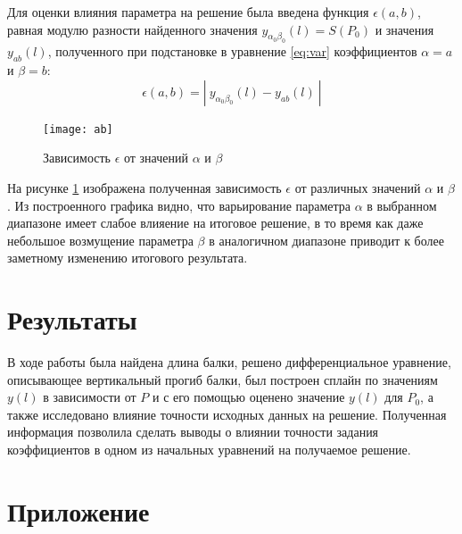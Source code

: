 Для оценки влияния параметра на решение была введена функция $\epsilon(a, b)$, равная модулю разности найденного значения $y_{\alpha_0\beta_0}(l) = S(P_0)$ и значения $y_{ab}(l)$, полученного при подстановке в уравнение \ref{eq:var} коэффициентов $\alpha = a$ и $\beta = b$:
\begin{equation}
	\epsilon(a, b) = |\ y_{\alpha_0\beta_0}(l) - y_{ab}(l)\ |
\end{equation}

\begin{figure}[H]
\begin{center}
	\vspace{-1cm}
	\texttt{[image: ab]}
	\caption{Зависимость $\epsilon$ от значений $\alpha$ и $\beta$}
	\label{plt:ab}
	\vspace{-0.5cm}
\end{center}
\end{figure}

На рисунке \ref{plt:ab} изображена полученная зависимость $\epsilon$ от различных значений $\alpha$ и $\beta$. Из построенного графика видно, что варьирование параметра  $\alpha$  в выбранном диапазоне имеет слабое влияение на итоговое решение, в то время как даже небольшое возмущение параметра  $\beta$  в аналогичном диапазоне приводит к более заметному изменению итогового результата.

\section{Результаты}

В ходе работы была найдена длина балки, решено дифференциальное уравнение, описывающее вертикальный прогиб балки, был построен сплайн по значениям $y(l)$ в зависимости от $P$ и с его помощью оценено значение $y(l)$ для $P_0$, а также исследовано влияние точности исходных данных на решение. Полученная информация позволила сделать выводы о влиянии точности задания коэффициентов в одном из начальных уравнений на получаемое решение.

\section*{Приложение}



